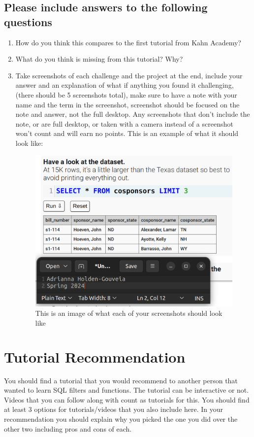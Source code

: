 \documentclass[12pt]{article}
\begin{document}
\subsection*{Please include answers to the following questions}
    \begin{enumerate}
        \item How do you think this compares to the first tutorial from  Kahn Academy?
        \item What do you think is missing from this tutorial? Why? 
        \item Take screenshots of each challenge and the project at the end, include your answer and an explanation of what if anything you found it challenging, (there should be 5 screenshots total), make sure to have a note with your name and the term in the screenshot, screenshot should be focused on the note and answer, not the full desktop.  Any screenshots that don't include the note, or are full desktop, or taken with a camera instead of a screenshot won't count and will earn no points. This is an example of what it should look like:        
 
        \begin{figure}[h!]
            \centerline{\includegraphics[scale=.2]{Examplewk6.png}}
            \caption{This is an image of what each of your screenshots should look like}

            \end{figure} 
    \end{enumerate}

    \section*{Tutorial Recommendation}
You should find a tutorial that you would recommend to another person that wanted to learn SQL filters and functions.  The tutorial can be interactive or not.  Videos that you can follow along with count as tutorials for this. You should find at least 3 options for tutorials/videos that you also include here. In your recommendation you should explain why you picked the one you did over the other two including pros and cons of each. 
\end{document}
